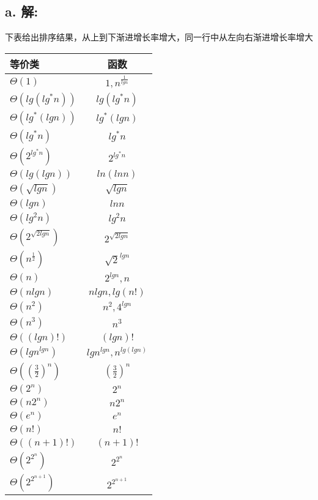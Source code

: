 \documentclass[12pt]{article}
\begin{document}
  \subsection*{a. \textbf{解:}}
    下表给出排序结果，从上到下渐进增长率增大，同一行中从左向右渐进增长率增大
    \begin{table}[h!]
      \begin{center}
        \begin{tabular}{l|c}
          \toprule
          \textbf{等价类} & \textbf{函数}\\
          \midrule
          $ \Theta(1) $ & $ 1, n^{\frac{1}{lgn}} $\\
          $ \Theta(lg(lg^*n)) $ & $ lg(lg^*n) $\\
          $ \Theta(lg^*(lgn)) $ & $ lg^*(lgn) $\\
          $ \Theta(lg^*n) $ & $ lg^*n $\\
          $ \Theta(2^{lg^*n}) $ & $ 2^{lg^*n} $\\
          $ \Theta(lg(lgn)) $ & $ ln(lnn) $\\
          $ \Theta(\sqrt{lgn}) $ & $ \sqrt{lgn} $\\
          $ \Theta(lgn) $ & $ lnn $\\
          $ \Theta(lg^2n) $ & $ lg^2n $\\
          $ \Theta(2^{\sqrt{2lgn}}) $ & $ 2^{\sqrt{2lgn}} $\\
          $ \Theta(n^{\frac{1}{2}}) $ & $ \sqrt{2}^{lgn} $\\
          $ \Theta(n) $ & $ 2^{lgn}, n $\\
          $ \Theta(nlgn) $ & $ nlgn, lg(n!) $\\
          $ \Theta(n^2) $ & $ n^2, 4^{lgn} $\\
          $ \Theta(n^3) $ & $ n^3 $\\
          $ \Theta((lgn)!) $ & $ (lgn)! $\\
          $ \Theta(lgn^{lgn}) $ & $ lgn^{lgn}, n^{lg(lgn)} $\\
          $ \Theta(\left(\frac{3}{2}\right)^{n}) $ & $ \left(\frac{3}{2}\right)^{n} $\\
          $ \Theta(2^n) $ & $ 2^n $\\
          $ \Theta(n2^n) $ & $ n2^n $\\
          $ \Theta(e^n) $ & $ e^n $\\
          $ \Theta(n!) $ & $ n! $\\
          $ \Theta((n+1)!) $ & $ (n+1)! $\\
          $ \Theta(2^{2^{n}}) $ & $ 2^{2^{n}} $\\
          $ \Theta(2^{2^{n+1}}) $ & $ 2^{2^{n+1}} $\\
          \bottomrule
        \end{tabular}
      \end{center}
    \end{table}
\end{document}
